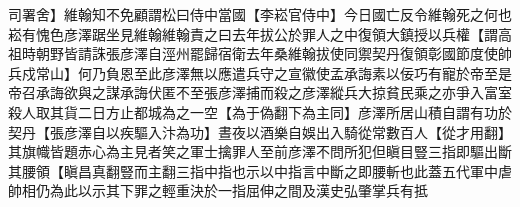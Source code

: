 司署舍】維翰知不免顧謂松曰侍中當國【李崧官侍中】今日國亡反令維翰死之何也崧有愧色彦澤踞坐見維翰維翰責之曰去年拔公於罪人之中復領大鎮授以兵權【謂高祖時朝野皆請誅張彦澤自涇州罷歸宿衛去年桑維翰拔使同禦契丹復領彰國節度使帥兵戍常山】何乃負恩至此彦澤無以應遣兵守之宣徽使孟承誨素以佞巧有寵於帝至是帝召承誨欲與之謀承誨伏匿不至張彦澤捕而殺之彦澤縱兵大掠貧民乘之亦爭入富室殺人取其貨二日方止都城為之一空【為于偽翻下為主同】彦澤所居山積自謂有功於契丹【張彦澤自以疾驅入汴為功】晝夜以酒樂自娛出入騎從常數百人【從才用翻】其旗幟皆題赤心為主見者笑之軍士擒罪人至前彦澤不問所犯但瞋目豎三指即驅出斷其腰領【瞋昌真翻豎而主翻三指中指也示以中指言中斷之即腰斬也此蓋五代軍中虐帥相仍為此以示其下罪之輕重決於一指屈伸之間及漢史弘肇掌兵有抵